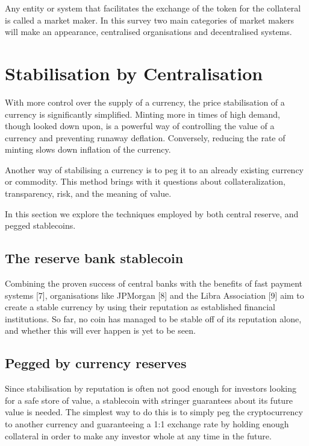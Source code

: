 \documentclass[english,]{IEEEtran}
\begin{document}
Any entity or system that facilitates the exchange of the token for the
collateral is called a market maker. In this survey two main categories
of market makers will make an appearance, centralised organisations and
decentralised systems.

\hypertarget{stabilisation-by-centralisation}{%
\section{Stabilisation by
Centralisation}\label{stabilisation-by-centralisation}}

With more control over the supply of a currency, the price stabilisation
of a currency is significantly simplified. Minting more in times of high
demand, though looked down upon, is a powerful way of controlling the
value of a currency and preventing runaway deflation. Conversely,
reducing the rate of minting slows down inflation of the currency.

Another way of stabilising a currency is to peg it to an already
existing currency or commodity. This method brings with it questions
about collateralization, transparency, risk, and the meaning of value.

In this section we explore the techniques employed by both central
reserve, and pegged stablecoins.

\hypertarget{the-reserve-bank-stablecoin}{%
\subsection{The reserve bank
stablecoin}\label{the-reserve-bank-stablecoin}}

Combining the proven success of central banks with the benefits of fast
payment systems {[}7{]}, organisations like JPMorgan {[}8{]} and the
Libra Association {[}9{]} aim to create a stable currency by using their
reputation as established financial institutions. So far, no coin has
managed to be stable off of its reputation alone, and whether this will
ever happen is yet to be seen.

\hypertarget{pegged-by-currency-reserves}{%
\subsection{Pegged by currency
reserves}\label{pegged-by-currency-reserves}}

Since stabilisation by reputation is often not good enough for investors
looking for a safe store of value, a stablecoin with stringer guarantees
about its future value is needed. The simplest way to do this is to
simply peg the cryptocurrency to another currency and guaranteeing a 1:1
exchange rate by holding enough collateral in order to make any investor
whole at any time in the future.
\end{document}
